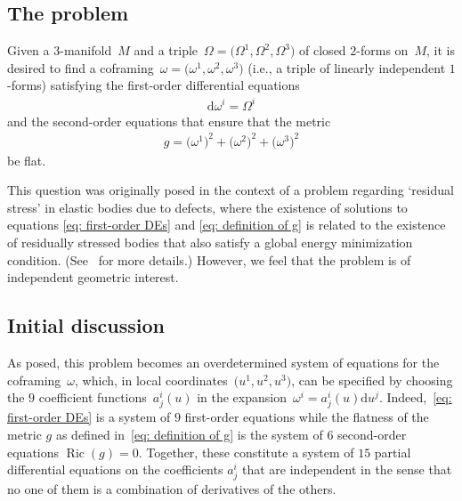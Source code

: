 \documentclass[11pt]{article}
\numberwithin{equation}{section}
\renewcommand{\d}{\mathrm{d}}%
\newcommand{\Ric}{\operatorname{Ric}}
\begin{document}
\subsection{The problem} Given a $3$-manifold~$M$
and a triple~$\Omega = \big(\Omega^1,\Omega^2,\Omega^3\big)$
of closed $2$-forms on~$M$,
it is desired to find a coframing~$\omega = \big(\omega^1,\omega^2,\omega^3\big)$
(i.e., a triple of linearly independent $1$-forms)
satisfying the first-order differential equations
\begin{gather}\label{eq: first-order DEs}
\d\omega^i = \Omega^i
\end{gather}
and the second-order equations that ensure that the metric
\begin{gather}\label{eq: definition of g}
g = \big(\omega^1\big)^2+\big(\omega^2\big)^2+\big(\omega^3\big)^2
\end{gather}
be flat.

This question was originally posed in the context of a problem regarding `residual stress' in elastic bodies due to defects, where the existence of solutions to equations \eqref{eq: first-order DEs} and \eqref{eq: definition of g} is related to the existence of residually stressed bodies that also satisfy a global energy minimization condition. (See~\cite{Acharya} for more details.) However, we feel that the problem is of independent geometric interest.

\subsection{Initial discussion}
As posed, this problem becomes an overdetermined system
of equations for the coframing~$\omega$,
which, in local coordinates~$\big(u^1,u^2,u^3\big)$, can be specified
by choosing the $9$ coefficient functions~$a^i_j(u)$
in the expansion~$\omega^i = a^i_j(u) \d u^j$.
Indeed,~\eqref{eq: first-order DEs}
is a system of $9$ first-order equations
while the flatness of the metric $g$
as defined in~\eqref{eq: definition of g}
is the system of $6$ second-order equations $\Ric(g) = 0$.
Together, these constitute a system of $15$
partial differential equations on the coefficients $a^i_j$
that are independent in the sense that no one of them is a combination of derivatives of the others.
\end{document}
